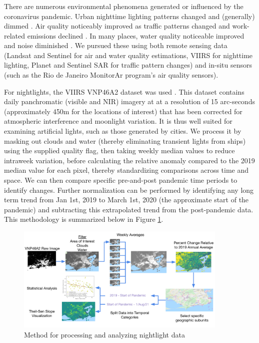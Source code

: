 \subsubsection{} \label{sec:vida-evdt-e-method}


There are numerous environmental phenomena generated or influenced by the coronavirus pandemic. Urban nighttime lighting patterns changed and (generally) dimmed \cite{elvidgeDimmingLightsChina2020}. Air quality noticeably improved as traffic patterns changed and work-related emissions declined \cite{isaifanDramaticImpactCoronavirus2020}. In many places, water quality noticeable improved and noise diminished \cite{aroraCoronavirusLockdownHelped2020}. We pursued these using both remote sensing data (Landsat and Sentinel for air and water quality estimations, VIIRS for nighttime lighting, Planet and Sentinel SAR for traffic pattern changes) and in-situ sensors (such as the Rio de Janeiro MonitorAr program's air quality sensors).

For nightlights, the VIIRS VNP46A2 dataset was used \cite{romanNASABlackMarble2018}. This dataset contains daily panchromatic (visible and NIR) imagery at at a resolution of 15 arc-seconds (approximately 450m for the locations of interest) that has been corrected for atmospheric interference and moonlight variation. It is thus well suited for examining artificial lights, such as those generated by cities. We process it by masking out clouds and water (thereby eliminating transient lights from ships) using the supplied quality flag, then taking weekly median values to reduce intraweek variation, before calculating the relative anomaly compared to the 2019 median value for each pixel, thereby standardizing comparisons across time and space. We can then compare specific pre-and-post pandemic time periods to identify changes. Further normalization can be performed by identifying any long term trend from Jan 1st, 2019 to March 1st, 2020 (the approximate start of the pandemic) and subtracting this extrapolated trend from the post-pandemic data. This methodology is summarized below in Figure \ref{fig:nightlights_method}.

\begin{figure}[h]
\centering
\includegraphics[width=0.9\textwidth]{Figures/chap5/nightlights_method.png}
\caption[Nightlights Processing Methodology]{Method for processing and analyzing nightlight data}
\label{fig:nightlights_method}
\end{figure}

